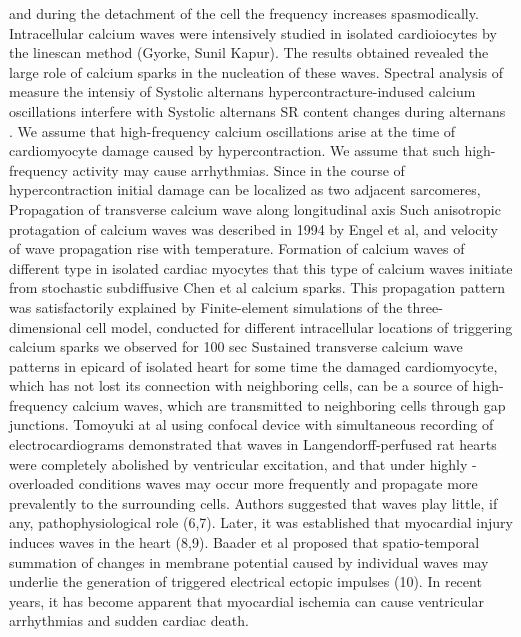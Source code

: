 \documentclass{biophys-new}
\begin{document}
and during the detachment of the cell the frequency increases spasmodically.
Intracellular calcium waves were intensively studied in isolated cardioiocytes by the linescan method (Gyorke, Sunil Kapur).
The results obtained revealed the large role of calcium sparks in the nucleation of these waves.
Spectral analysis of measure the intensiy of Systolic  alternans
hypercontracture-indused calcium oscillations interfere with Systolic  alternans SR  content changes during alternans \cite{diaz2004sarcoplasmic}.
We assume that high-frequency calcium oscillations arise at the time of cardiomyocyte damage caused by hypercontraction.
We assume that such high-frequency activity may cause arrhythmias.
Since in the course of hypercontraction initial damage can be localized as two adjacent sarcomeres,
Propagation of transverse calcium wave along longitudinal axis
Such anisotropic protagation of calcium waves was described in 1994 by Engel et al, and velocity of wave propagation rise with temperature.
Formation of calcium waves of different type in isolated cardiac myocytes \cite{ishida1999formation}
that this type of calcium waves initiate from stochastic \cite{izu2001evolution} subdiffusive  \cite{chen2014ryanodine} Chen et al  calcium sparks.
This propagation pattern was satisfactorily explained by Finite-element simulations of the three-dimensional cell model, conducted for different intracellular locations of triggering calcium sparks \cite{tracqui2009integrated}
we observed for 100 sec Sustained transverse calcium wave patterns in epicard of isolated heart
for some time the damaged cardiomyocyte, which has not lost its connection with neighboring cells, can be a source of high-frequency calcium waves, which are transmitted to neighboring cells through gap junctions.
Tomoyuki at al using confocal device with simultaneous recording of electrocardiograms demonstrated that  waves in Langendorff-perfused rat hearts were completely abolished by ventricular excitation, and that under highly  -overloaded conditions  waves may occur more frequently and propagate more prevalently to the surrounding cells. Authors suggested that  waves play little, if any, pathophysiological role (6,7). Later, it was established that myocardial injury induces  waves in the heart (8,9). Baader et al proposed that spatio-temporal summation of changes in membrane potential caused by individual  waves may underlie the generation of triggered electrical ectopic impulses (10).
In recent years, it has become apparent that myocardial ischemia can cause ventricular arrhythmias and sudden cardiac death.
\end{document}
